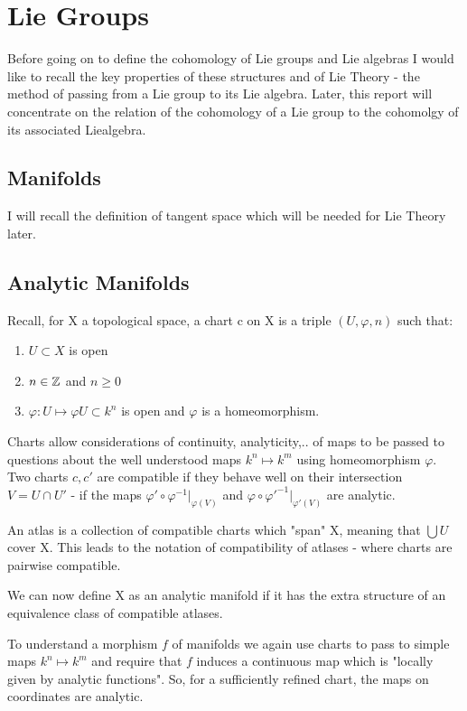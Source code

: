 \section{Lie Groups}

Before going on to define the cohomology of Lie groups and Lie
algebras I would like to recall the key properties of these
structures and of Lie Theory - the method of passing from a Lie
group to its Lie algebra. Later, this report will concentrate on
the relation of the cohomology of a Lie group to the cohomolgy of
its associated Liealgebra.

\subsection{Manifolds}\label{df2.1}
I will recall the definition of tangent space which will be needed
for Lie Theory later.

\subsection{Analytic Manifolds}\label{df2.1.1}
Recall, for X a topological space, a chart c on X is a triple
$(U,\varphi, n)$ such that:
\begin{enumerate}
    \item $U\subset X$ is open
    \item $n\in \mathbb Z$ and $n\geq 0$
    \item $\varphi : U \mapsto \varphi U \subset k^n$ is open and
    $\varphi$ is a homeomorphism.
\end{enumerate}
Charts allow considerations of continuity, analyticity,.. of maps
to be passed to questions about the well understood maps $k^n
\mapsto k^m$ using homeomorphism $\varphi$. Two charts $c,c'$ are
compatible if they behave well on their intersection $V = U \cap
U'$ - if the maps $\varphi' \circ \varphi^{-1} |_{\varphi (V)}$
and $\varphi \circ \varphi'^{-1} |_{\varphi' (V)}$ are analytic.

An atlas is a collection of compatible charts which "span" X,
meaning that $\bigcup U$ cover X. This leads to the notation of
compatibility of atlases - where charts are pairwise compatible.

We can now define X as an analytic manifold if it has the extra
structure of an equivalence class of compatible atlases.

To understand a morphism $f$ of manifolds we again use charts to
pass to simple maps $k^n \mapsto k^m$ and require that $f$ induces
a continuous map which is "locally given by analytic functions".
So, for a sufficiently refined chart, the maps on coordinates are
analytic.

